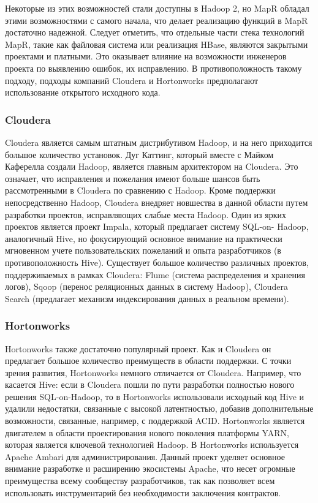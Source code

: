 Некоторые из этих возможностей стали доступны в Hadoop 2, но MapR обладал этими возможностями с самого начала, что делает реализацию функций в MapR достаточно надежной. Следует отметить, что отдельные части стека технологий MapR, такие как файловая система или реализация HBase, являются закрытыми проектами и платными. Это оказывает влияние на возможности инженеров проекта по выявлению ошибок, их исправлению. В противоположность такому подходу, подходы компаний Cloudera и Hortonworks предполагают использование открытого исходного кода.

\subsubsection{Cloudera}
Cloudera является самым штатным дистрибутивом Hadoop, и на него приходится большое количество установок. Дуг Каттинг, который вместе с Майком Каферелла создали Hadoop, является главным архитектором на Cloudera. Это означает, что исправления и пожелания имеют больше шансов быть рассмотренными в Cloudera по сравнению с Hadoop. Кроме поддержки непосредственно Hadoop, Cloudera внедряет новшества в данной области путем разработки проектов, исправляющих слабые места Hadoop. Один из ярких проектов является проект Impala, который предлагает систему SQL-on- Hadoop, аналогичный Hive, но фокусирующий основное внимание на практически мгновенном учете пользовательских пожеланий и опыта разработчиков (в противоположность Hive). Существует большое количество различных проектов, поддерживаемых в рамках Cloudera: Flume (система распределения и хранения логов), Sqoop (перенос реляционных данных в систему Hadoop), Cloudera Search (предлагает механизм индексирования данных в реальном времени).

\subsubsection{Hortonworks}
Hortonworks также достаточно популярный проект. Как и Cloudera он предлагает большое количество преимуществ в области поддержки.
С точки зрения развития, Hortonworks немного отличается от Cloudera. Например, что касается Hive: если в Cloudera пошли по пути разработки полностью нового решения SQL-on-Hadoop, то в Hortonworks использовали исходный код Hive и удалили недостатки, связанные с высокой латентностью, добавив дополнительные возможности, связанные, например, с поддержкой ACID. Hortonworks является двигателем в области проектирования нового поколения платформы YARN, которая является ключевой технологией Hadoop. В Hortonworks используется Apache Ambari для администрирования. Данный проект уделяет основное внимание разработке и расширению экосистемы Apache, что несет огромные преимущества всему сообществу разработчиков, так как позволяет всем использовать инструментарий без необходимости заключения контрактов.

